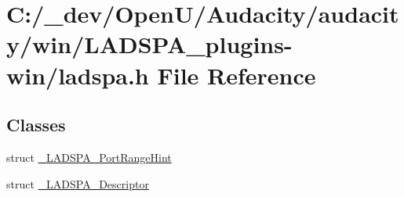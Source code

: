 \hypertarget{win_2_l_a_d_s_p_a__plugins-win_2ladspa_8h}{}\section{C\+:/\+\_\+dev/\+Open\+U/\+Audacity/audacity/win/\+L\+A\+D\+S\+P\+A\+\_\+plugins-\/win/ladspa.h File Reference}
\label{win_2_l_a_d_s_p_a__plugins-win_2ladspa_8h}
\subsection*{Classes}
\begin{DoxyCompactItemize}
\item 
struct \hyperlink{struct___l_a_d_s_p_a___port_range_hint}{\+\_\+\+L\+A\+D\+S\+P\+A\+\_\+\+Port\+Range\+Hint}
\item 
struct \hyperlink{struct___l_a_d_s_p_a___descriptor}{\+\_\+\+L\+A\+D\+S\+P\+A\+\_\+\+Descriptor}
\end{DoxyCompactItemize}
